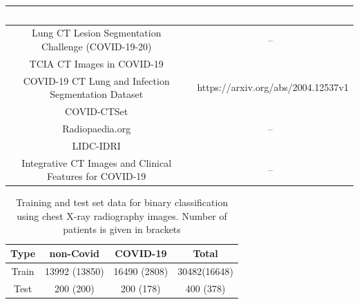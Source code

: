 \documentclass[10pt,journal,compsoc]{IEEEtran}
\begin{document}
\begin{table}[!t]
\begin{tabular}{|c|c|}
&~\cite{zhang2020clinically}\\
\hline
 Lung CT Lesion Segmentation Challenge (COVID-19-20)

& --\\
\hline
 TCIA CT Images in COVID-19

&~\cite{an2020ct}\\
\hline
 COVID-19 CT Lung and Infection Segmentation Dataset

&~https://arxiv.org/abs/2004.12537v1\\
\hline
 COVID-CTSet

&~\cite{rahimzadeh2020fully}\\
\hline
 Radiopaedia.org

&--\\
\hline
 LIDC-IDRI

&~\cite{armato2011lung}\\
\hline
 Integrative CT Images and Clinical Features for COVID-19

&--\\
\hline

\end{tabular}
\end{table}

\begin{table}
\renewcommand{\arraystretch}{1.3}
\caption{Training and test set data for binary classification using chest X-ray radiography images. Number of patients is given in brackets}
\label{table_2}
\centering
\begin{tabular}{|c|c|c|c|}
\hline
Type & non-Covid & COVID-19  & Total\\
\hline
Train & 13992 (13850) & 16490 (2808) & 30482(16648) \\
\hline
Test & 200 (200) & 200 (178) & 400 (378) \\
\hline
\end{tabular}
\end{table}
\end{document}
